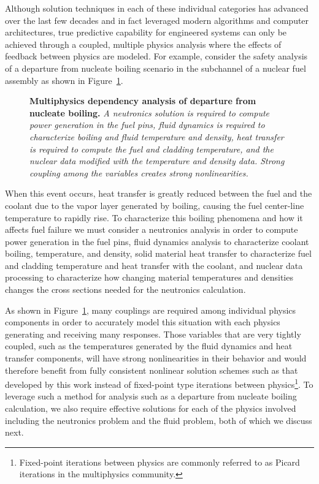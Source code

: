 Although solution techniques in each of these individual categories
has advanced over the last few decades and in fact leveraged modern
algorithms and computer architectures, true predictive capability for
engineered systems can only be achieved through a coupled, multiple
physics analysis where the effects of feedback between physics are
modeled. For example, consider the safety analysis of a departure from
nucleate boiling scenario in the subchannel of a nuclear fuel
assembly as shown in Figure~\ref{fig:dnb_example}.

\begin{figure}[t!]
  \begin{center}
    \scalebox{1.5}{
       }
  \end{center}
  \caption{\textbf{Multiphysics dependency analysis of departure from
      nucleate boiling.} \textit{A neutronics solution is required to
      compute power generation in the fuel pins, fluid dynamics is
      required to characterize boiling and fluid temperature and
      density, heat transfer is required to compute the fuel and
      cladding temperature, and the nuclear data modified with the
      temperature and density data. Strong coupling among the
      variables creates strong nonlinearities.}}
  \label{fig:dnb_example}
\end{figure}

When this event occurs, heat transfer is greatly reduced between the
fuel and the coolant due to the vapor layer generated by boiling,
causing the fuel center-line temperature to rapidly rise. To
characterize this boiling phenomena and how it affects fuel failure we
must consider a neutronics analysis in order to compute power
generation in the fuel pins, fluid dynamics analysis to characterize
coolant boiling, temperature, and density, solid material heat
transfer to characterize fuel and cladding temperature and heat
transfer with the coolant, and nuclear data processing to characterize
how changing material temperatures and densities changes the cross
sections needed for the neutronics calculation.

As shown in Figure~\ref{fig:dnb_example}, many couplings are required
among individual physics components in order to accurately model this
situation with each physics generating and receiving many
responses. Those variables that are very tightly coupled, such as the
temperatures generated by the fluid dynamics and heat transfer
components, will have strong nonlinearities in their behavior and
would therefore benefit from fully consistent nonlinear solution
schemes such as that developed by this work instead of fixed-point
type iterations between physics\footnote{Fixed-point iterations
  between physics are commonly referred to as Picard iterations in the
  multiphysics community.}. To leverage such a method for analysis
such as a departure from nucleate boiling calculation, we also require
effective solutions for each of the physics involved including the
neutronics problem and the fluid problem, both of which we discuss
next.

